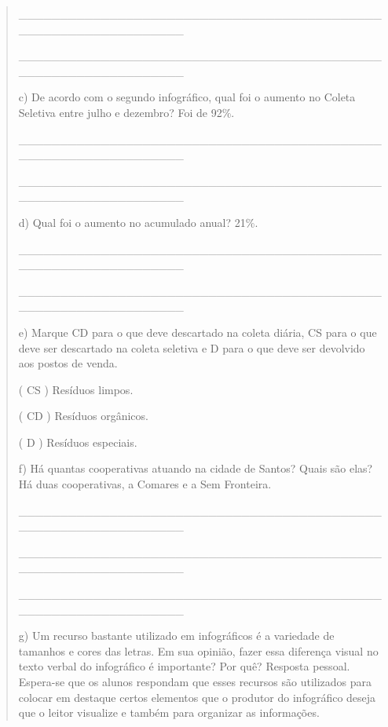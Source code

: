 \begin{itemize}
{{{\begin{itemize}
\begin{itemize}
\begin{itemize}
\begin{quote}
\_\_\_\_\_\_\_\_\_\_\_\_\_\_\_\_\_\_\_\_\_\_\_\_\_\_\_\_\_\_\_\_\_\_\_\_\_\_\_\_\_\_\_\_\_\_\_\_\_\_\_\_\_\_\_\_\_\_\_\_\_\_\_\_

\_\_\_\_\_\_\_\_\_\_\_\_\_\_\_\_\_\_\_\_\_\_\_\_\_\_\_\_\_\_\_\_\_\_\_\_\_\_\_\_\_\_\_\_\_\_\_\_\_\_\_\_\_\_\_\_\_\_\_\_\_\_\_\_

c) De acordo com o segundo infográfico, qual foi o aumento no Coleta
Seletiva entre julho e dezembro? Foi de 92\%.

\_\_\_\_\_\_\_\_\_\_\_\_\_\_\_\_\_\_\_\_\_\_\_\_\_\_\_\_\_\_\_\_\_\_\_\_\_\_\_\_\_\_\_\_\_\_\_\_\_\_\_\_\_\_\_\_\_\_\_\_\_\_\_\_

\_\_\_\_\_\_\_\_\_\_\_\_\_\_\_\_\_\_\_\_\_\_\_\_\_\_\_\_\_\_\_\_\_\_\_\_\_\_\_\_\_\_\_\_\_\_\_\_\_\_\_\_\_\_\_\_\_\_\_\_\_\_\_\_

d) Qual foi o aumento no acumulado anual? 21\%.

\_\_\_\_\_\_\_\_\_\_\_\_\_\_\_\_\_\_\_\_\_\_\_\_\_\_\_\_\_\_\_\_\_\_\_\_\_\_\_\_\_\_\_\_\_\_\_\_\_\_\_\_\_\_\_\_\_\_\_\_\_\_\_\_

\_\_\_\_\_\_\_\_\_\_\_\_\_\_\_\_\_\_\_\_\_\_\_\_\_\_\_\_\_\_\_\_\_\_\_\_\_\_\_\_\_\_\_\_\_\_\_\_\_\_\_\_\_\_\_\_\_\_\_\_\_\_\_\_

e) Marque CD para o que deve descartado na coleta diária, CS para o que
deve ser descartado na coleta seletiva e D para o que deve ser devolvido
aos postos de venda.

( CS ) Resíduos limpos.

( CD ) Resíduos orgânicos.

( D ) Resíduos especiais.

f) Há quantas cooperativas atuando na cidade de Santos? Quais são elas?
Há duas cooperativas, a Comares e a Sem Fronteira.

\_\_\_\_\_\_\_\_\_\_\_\_\_\_\_\_\_\_\_\_\_\_\_\_\_\_\_\_\_\_\_\_\_\_\_\_\_\_\_\_\_\_\_\_\_\_\_\_\_\_\_\_\_\_\_\_\_\_\_\_\_\_\_\_

\_\_\_\_\_\_\_\_\_\_\_\_\_\_\_\_\_\_\_\_\_\_\_\_\_\_\_\_\_\_\_\_\_\_\_\_\_\_\_\_\_\_\_\_\_\_\_\_\_\_\_\_\_\_\_\_\_\_\_\_\_\_\_\_

\_\_\_\_\_\_\_\_\_\_\_\_\_\_\_\_\_\_\_\_\_\_\_\_\_\_\_\_\_\_\_\_\_\_\_\_\_\_\_\_\_\_\_\_\_\_\_\_\_\_\_\_\_\_\_\_\_\_\_\_\_\_\_\_

g) Um recurso bastante utilizado em infográficos é a variedade de
tamanhos e cores das letras. Em sua opinião, fazer essa diferença visual
no texto verbal do infográfico é importante? Por quê? Resposta pessoal.
Espera-se que os alunos respondam que esses recursos são utilizados para
colocar em destaque certos elementos que o produtor do infográfico
deseja que o leitor visualize e também para organizar as informações.


\end{quote}
\end{itemize}
\end{itemize}
\end{itemize}}}}
\end{itemize}
